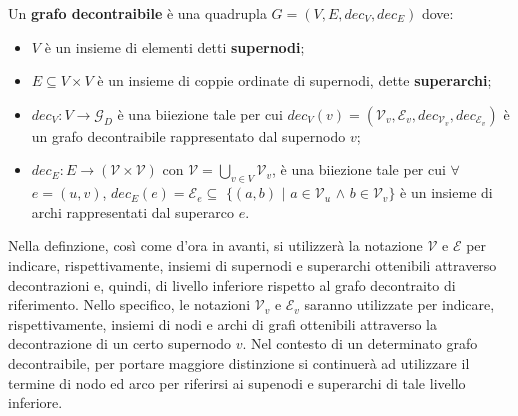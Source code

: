     \begin{definition}
        Un \textbf{grafo decontraibile} \`e una quadrupla $G = (V, E, dec_V, dec_E)$ dove:
        \begin{itemize}
            \item $V$ \`e un insieme di elementi detti \textbf{supernodi};
            \item $E \subseteq V \times V$ \`e un insieme di coppie ordinate di supernodi, dette \textbf{superarchi};
            \item $dec_V : V \rightarrow \mathcal{G}_D$ \`e una biiezione tale per cui $dec_V(v) = (\mathcal{V}_v,
                \mathcal{E}_v, dec_{\mathcal{V}_v}, dec_{\mathcal{E}_v})$ \`e un grafo decontraibile rappresentato
                dal supernodo $v$;
            \item $dec_E : E \rightarrow (\mathcal{V} \times \mathcal{V})$ con $\mathcal{V} = \bigcup_{v \in V}\mathcal{V}_v$,
                \`e una biiezione tale per cui $\forall$ $ e = (u, v)$, $dec_E(e) = \mathcal{E}_e \subseteq$ $\{(a, b)$ $\mid$ $a \in \mathcal{V}_u$ $\wedge$
                $b \in \mathcal{V}_v\}$ \`e un insieme di archi rappresentati dal superarco $e$.
        \end{itemize}
    \end{definition}

    Nella definzione, cos\`{i} come d'ora in avanti, si utilizzer\`a la notazione $\mathcal{V}$ e $\mathcal{E}$ per
    indicare, rispettivamente, insiemi di supernodi e superarchi ottenibili attraverso decontrazioni e, quindi, di
    livello inferiore rispetto al grafo decontraito di riferimento.
    Nello specifico, le notazioni $\mathcal{V}_v$ e $\mathcal{E}_v$ saranno utilizzate per indicare, rispettivamente,
    insiemi di nodi e archi di grafi ottenibili attraverso la decontrazione di un certo supernodo $v$.
    Nel contesto di un determinato grafo decontraibile, per portare maggiore distinzione si continuer\`a ad utilizzare
    il termine di nodo ed arco per riferirsi ai supenodi e superarchi di tale livello inferiore. \newline

